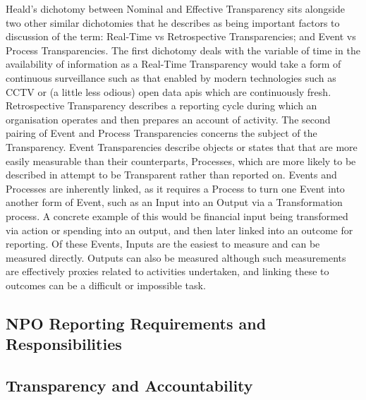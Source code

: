 Heald's dichotomy between Nominal and Effective Transparency sits alongside two other similar dichotomies that he describes as being important factors to discussion of the term: Real-Time vs Retrospective Transparencies; and Event vs Process Transparencies. The first dichotomy deals with the variable of time in the availability of information as a Real-Time Transparency would take a form of continuous surveillance such as that enabled by modern technologies such as CCTV or (a little less odious) open data apis which are continuously fresh. Retrospective Transparency describes a reporting cycle during which an organisation operates and then prepares an account of activity. The second pairing of Event and Process Transparencies concerns the subject of the Transparency. Event Transparencies describe objects or states that that are more easily measurable than their counterparts, Processes, which are more likely to be described in attempt to be Transparent rather than reported on. Events and Processes are inherently linked, as it requires a Process to turn one Event into another form of Event, such as an Input into an Output via a Transformation process. A concrete example of this would be financial input being transformed via action or spending into an output, and then later linked into an outcome for reporting. Of these Events, Inputs are the easiest to measure and can be measured directly. Outputs can also be measured although such measurements are effectively proxies related to activities undertaken, and linking these to outcomes can be a difficult or impossible task.


\subsection{NPO Reporting Requirements and Responsibilities}
\subsection{Transparency and Accountability}


